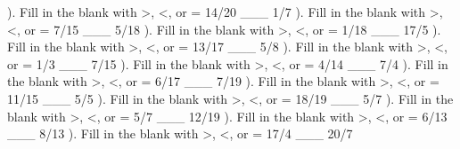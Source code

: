 \documentclass{article}%
\begin{document}
\newline%
\newline%
). Fill in the blank with >, <, or = 14/20 \_\_\_ 1/7%
\newline%
\newline%
). Fill in the blank with >, <, or = 7/15 \_\_\_ 5/18%
\newline%
\newline%
). Fill in the blank with >, <, or = 1/18 \_\_\_ 17/5%
\newline%
\newline%
). Fill in the blank with >, <, or = 13/17 \_\_\_ 5/8%
\newline%
\newline%
). Fill in the blank with >, <, or = 1/3 \_\_\_ 7/15%
\newline%
\newline%
). Fill in the blank with >, <, or = 4/14 \_\_\_ 7/4%
\newline%
\newline%
). Fill in the blank with >, <, or = 6/17 \_\_\_ 7/19%
\newline%
\newline%
). Fill in the blank with >, <, or = 11/15 \_\_\_ 5/5%
\newline%
\newline%
). Fill in the blank with >, <, or = 18/19 \_\_\_ 5/7%
\newline%
\newline%
). Fill in the blank with >, <, or = 5/7 \_\_\_ 12/19%
\newline%
\newline%
). Fill in the blank with >, <, or = 6/13 \_\_\_ 8/13%
\newline%
\newline%
). Fill in the blank with >, <, or = 17/4 \_\_\_ 20/7%
\newline%
\newline%
\newline%
\end{document}
